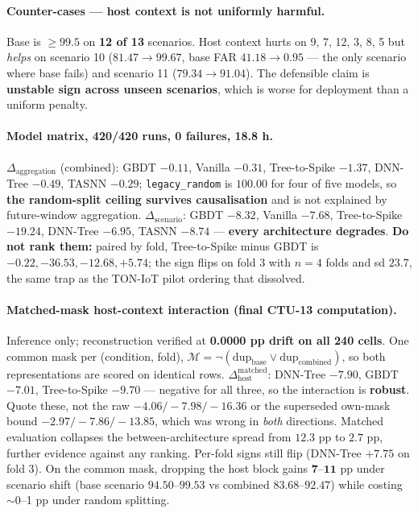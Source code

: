 \paragraph{Counter-cases --- host context is not uniformly harmful.} Base is $\geq99.5$ on
\textbf{12 of 13} scenarios. Host context hurts on 9, 7, 12, 3, 8, 5 but \emph{helps} on
scenario 10 ($81.47 \rightarrow 99.67$, base FAR $41.18 \rightarrow 0.95$ --- the only
scenario where base fails) and scenario 11 ($79.34 \rightarrow 91.04$). The defensible
claim is \textbf{unstable sign across unseen scenarios}, which is worse for deployment
than a uniform penalty.

\paragraph{Model matrix, 420/420 runs, 0 failures, 18.8 h.}
$\Delta_{\mathrm{aggregation}}$ (combined): GBDT $-0.11$, Vanilla $-0.31$, Tree-to-Spike
$-1.37$, DNN-Tree $-0.49$, TASNN $-0.29$; \texttt{legacy\_random} is $100.00$ for four of
five models, so \textbf{the random-split ceiling survives causalisation} and is not
explained by future-window aggregation.
$\Delta_{\mathrm{scenario}}$: GBDT $-8.32$, Vanilla $-7.68$, Tree-to-Spike $-19.24$,
DNN-Tree $-6.95$, TASNN $-8.74$ --- \textbf{every architecture degrades}.
\textbf{Do not rank them:} paired by fold, Tree-to-Spike minus GBDT is
$-0.22, -36.53, -12.68, \mathbf{+5.74}$; the sign flips on fold 3 with $n=4$ folds and
sd $23.7$, the same trap as the TON-IoT pilot ordering that dissolved.

\paragraph{Matched-mask host-context interaction (final CTU-13 computation).} Inference
only; reconstruction verified at \textbf{0.0000 pp drift on all 240 cells}. One common
mask per (condition, fold), $\mathcal{M}=\neg(\mathrm{dup}_{\mathrm{base}} \vee
\mathrm{dup}_{\mathrm{combined}})$, so both representations are scored on identical rows.
$\Delta_{\mathrm{host}}^{\mathrm{matched}}$: DNN-Tree $\mathbf{-7.90}$, GBDT
$\mathbf{-7.01}$, Tree-to-Spike $\mathbf{-9.70}$ --- negative for all three, so the
interaction is \textbf{robust}. Quote these, not the raw $-4.06/-7.98/-16.36$ or the
superseded own-mask bound $-2.97/-7.86/-13.85$, which was wrong in \emph{both} directions.
Matched evaluation collapses the between-architecture spread from $12.3$ pp to
$\mathbf{2.7}$ pp, further evidence against any ranking. Per-fold signs still flip
(DNN-Tree $+7.75$ on fold 3). On the common mask, dropping the host block gains
$\mathbf{7}$--$\mathbf{11}$ pp under scenario shift (base scenario $94.50$--$99.53$ vs
combined $83.68$--$92.47$) while costing $\sim$0--1 pp under random splitting.

